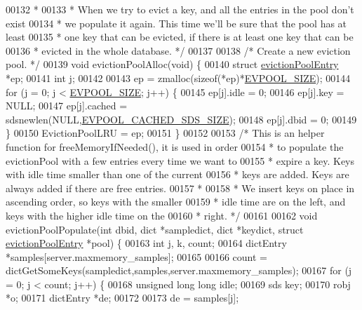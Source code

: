 \begin{DoxyCode}
00132 \textcolor{comment}{ *}
00133 \textcolor{comment}{ * When we try to evict a key, and all the entries in the pool don't exist}
00134 \textcolor{comment}{ * we populate it again. This time we'll be sure that the pool has at least}
00135 \textcolor{comment}{ * one key that can be evicted, if there is at least one key that can be}
00136 \textcolor{comment}{ * evicted in the whole database. */}
00137 
00138 \textcolor{comment}{/* Create a new eviction pool. */}
00139 \textcolor{keywordtype}{void} evictionPoolAlloc(\textcolor{keywordtype}{void}) \{
00140     \textcolor{keyword}{struct} \hyperlink{structevictionPoolEntry}{evictionPoolEntry} *ep;
00141     \textcolor{keywordtype}{int} j;
00142 
00143     ep = zmalloc(\textcolor{keyword}{sizeof}(*ep)*\hyperlink{evict_8c_a459751f47982906b9beb736ea3519e97}{EVPOOL\_SIZE});
00144     \textcolor{keywordflow}{for} (j = 0; j < \hyperlink{evict_8c_a459751f47982906b9beb736ea3519e97}{EVPOOL\_SIZE}; j++) \{
00145         ep[j].idle = 0;
00146         ep[j].key = NULL;
00147         ep[j].cached = sdsnewlen(NULL,\hyperlink{evict_8c_acfb2106a0b0fb572e25c170d78ab1729}{EVPOOL\_CACHED\_SDS\_SIZE});
00148         ep[j].dbid = 0;
00149     \}
00150     EvictionPoolLRU = ep;
00151 \}
00152 
00153 \textcolor{comment}{/* This is an helper function for freeMemoryIfNeeded(), it is used in order}
00154 \textcolor{comment}{ * to populate the evictionPool with a few entries every time we want to}
00155 \textcolor{comment}{ * expire a key. Keys with idle time smaller than one of the current}
00156 \textcolor{comment}{ * keys are added. Keys are always added if there are free entries.}
00157 \textcolor{comment}{ *}
00158 \textcolor{comment}{ * We insert keys on place in ascending order, so keys with the smaller}
00159 \textcolor{comment}{ * idle time are on the left, and keys with the higher idle time on the}
00160 \textcolor{comment}{ * right. */}
00161 
00162 \textcolor{keywordtype}{void} evictionPoolPopulate(\textcolor{keywordtype}{int} dbid, dict *sampledict, dict *keydict, \textcolor{keyword}{struct} 
      \hyperlink{structevictionPoolEntry}{evictionPoolEntry} *pool) \{
00163     \textcolor{keywordtype}{int} j, k, count;
00164     dictEntry *samples[server.maxmemory\_samples];
00165 
00166     count = dictGetSomeKeys(sampledict,samples,server.maxmemory\_samples);
00167     \textcolor{keywordflow}{for} (j = 0; j < count; j++) \{
00168         \textcolor{keywordtype}{unsigned} \textcolor{keywordtype}{long} \textcolor{keywordtype}{long} idle;
00169         sds key;
00170         robj *o;
00171         dictEntry *de;
00172 
00173         de = samples[j];

\end{DoxyCode}
